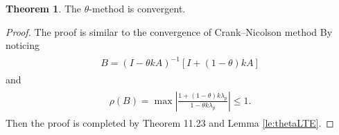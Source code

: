 \documentclass[a4paper,twoside]{ctexart}
\theoremstyle{definition}
\newtheorem{theorem}[definition]{Theorem}
\begin{document}
\begin{theorem}
	The $\theta$-method is convergent.
\end{theorem}
\begin{proof}
	The proof is similar to the convergence of Crank–Nicolson method By noticing
	\begin{eqnarray}
	\label{eq:thetaB}
	\begin{aligned}
	B = (I-\theta kA)^{-1}[I+(1-\theta)kA]
	\end{aligned}
	\end{eqnarray}
	and
	\begin{eqnarray}
	\begin{aligned}
	\rho(B) = \max\left|\frac{1+(1-\theta)k\lambda_p}{1-\theta k\lambda_p}\right| \le 1.
	\end{aligned}
	\end{eqnarray}
	Then the proof is completed by Theorem 11.23 and Lemma \ref{le:thetaLTE}.
\end{proof}
\end{document}
